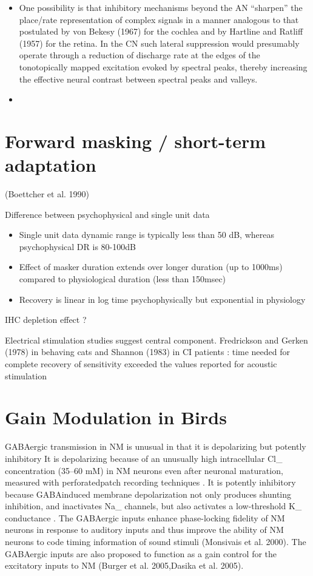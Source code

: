 \documentclass[10pt,a4paper]{article}
\begin{document}
\begin{itemize}
\item One possibility is that inhibitory mechanisms beyond the AN
  {\textquotedblleft}sharpen{\textquotedblright} the place/rate representation
  of complex signals in a manner analogous to that postulated by von Bekesy
  (1967) for the cochlea and by Hartline and Ratliff (1957) for the retina. In
  the CN such lateral suppression would presumably operate through a reduction
  of discharge rate at the edges of the tonotopically mapped excitation evoked
  by spectral peaks, thereby increasing the effective neural contrast between
  spectral peaks and valleys.
\item \end{itemize}
\section{Forward masking / short-term adaptation}
(Boettcher et al. 1990)

Difference between psychophysical and single unit data


\begin{itemize}
\item Single unit data dynamic range is typically less than 50 dB, whereas
  psychophysical DR is 80-100dB
\item Effect of masker duration extends over longer duration (up to 1000ms)
  compared to physiological duration (less than 150msec)
\item Recovery is linear in log time psychophysically but exponential in
  physiology \citep{Carlyon:1988}
\end{itemize}
IHC depletion effect ?  \citep{WestermanSmith:1987}

Electrical stimulation studies suggest central component. Fredrickson and Gerken
(1978) in behaving cats and Shannon (1983) in CI patients : time needed for
complete recovery of sensitivity exceeded the values reported for acoustic
stimulation

\section{Gain Modulation in Birds}
\citep{Lu:2007}

GABAergic transmission in NM is unusual in that it is depolarizing but potently
inhibitory %
It is depolarizing because of an unusually high intracellular Cl\_ concentration
(35--60 mM) in NM neurons even after neuronal maturation, measured with
perforatedpatch recording techniques
\citep{LuTrussell:2001,MonsivaisRubel:2001}. It is potently inhibitory because
GABAinduced membrane depolarization not only produces shunting inhibition, and
inactivates Na\_ channels, but also activates a low-threshold K\_ conductance
\citep{MonsivaisRubel:2001}.  The GABAergic inputs enhance phase-locking
fidelity of NM neurons in response to auditory inputs and thus improve the
ability of NM neurons to code timing information of sound stimuli (Monsivais et
al. 2000).  The GABAergic inputs are also proposed to function as a gain control
for the excitatory inputs to NM (Burger et al. 2005,Dasika et al. 2005).


 

\end{document}

